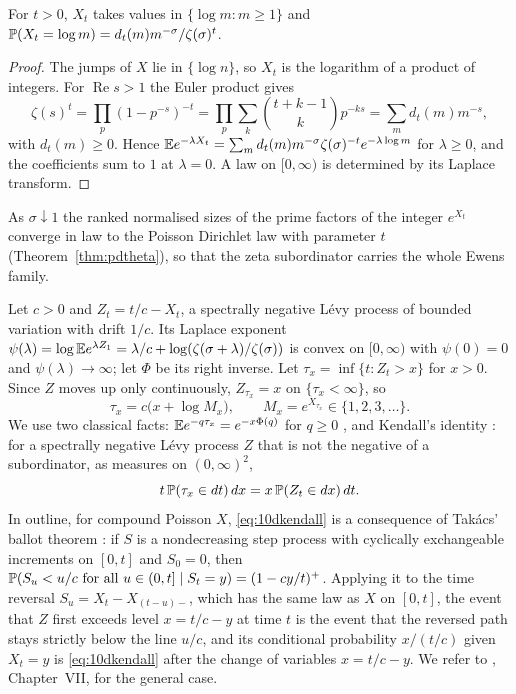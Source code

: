 \begin{proposition}\label{prop:10dsublaw}
For $t>0$, $X_t$ takes values in $\{\log m:m\ge1\}$ and $\mathbb{P}(X_t = \log m) = d_t(m)m^{-\sigma}/\zeta(\sigma)^t$.
\end{proposition}

\begin{proof}
The jumps of $X$ lie in $\{\log n\}$, so $X_t$ is the logarithm of a product of integers. For $\operatorname{Re}s>1$ the Euler product gives
\[
\zeta(s)^t = \prod_p(1-p^{-s})^{-t} = \prod_p\sum_k\binom{t+k-1}kp^{-ks} = \sum_md_t(m)m^{-s},
\]
with $d_t(m)\ge0$. Hence $\mathbb{E} e^{-\lambda X_t} = \sum_m d_t(m)m^{-\sigma}\zeta(\sigma)^{-t}e^{-\lambda\log m}$ for $\lambda\ge0$, and the coefficients sum to $1$ at $\lambda = 0$. A law on $[0,\infty)$ is determined by its Laplace transform.
\end{proof}

As $\sigma\downarrow1$ the ranked normalised sizes of the prime factors of the integer $e^{X_t}$ converge in law to the Poisson Dirichlet law with parameter $t$ (Theorem~\ref{thm:pdtheta}), so that the zeta subordinator carries the whole Ewens family.

Let $c>0$ and $Z_t = t/c-X_t$, a spectrally negative L\'evy process of bounded variation with drift $1/c$. Its Laplace exponent $\psi(\lambda) = \log\mathbb{E} e^{\lambda Z_1} = \lambda/c+\log(\zeta(\sigma+\lambda)/\zeta(\sigma))$ is convex on $[0,\infty)$ with $\psi(0)=0$ and $\psi(\lambda)\to\infty$; let $\Phi$ be its right inverse. Let $\tau_x = \inf\{t:Z_t>x\}$ for $x>0$. Since $Z$ moves up only continuously, $Z_{\tau_x} = x$ on $\{\tau_x<\infty\}$, so
\[
\tau_x = c\bigl(x+\log M_x\bigr),\qquad M_x = e^{X_{\tau_x}}\in\{1,2,3,\dots\}.
\]
We use two classical facts: $\mathbb{E} e^{-q\tau_x} = e^{-x\Phi(q)}$ for $q\ge0$ \cite{bertoin1996,kyprianou2014}, and Kendall's identity \cite{kendall1957,bertoin1996,kyprianou2014}: for a spectrally negative L\'evy process $Z$ that is not the negative of a subordinator, as measures on $(0,\infty)^2$,
\begin{equation}\label{eq:10dkendall}
t\,\mathbb{P}(\tau_x\in dt)\,dx = x\,\mathbb{P}(Z_t\in dx)\,dt .
\end{equation}
In outline, for compound Poisson $X$, \eqref{eq:10dkendall} is a consequence of Tak\'acs' ballot theorem \cite{takacs1967}: if $S$ is a nondecreasing step process with cyclically exchangeable increments on $[0,t]$ and $S_0 = 0$, then $\mathbb{P}(S_u<u/c\text{ for all }u\in(0,t]\mid S_t = y) = (1-cy/t)^+$. Applying it to the time reversal $S_u = X_t-X_{(t-u)-}$, which has the same law as $X$ on $[0,t]$, the event that $Z$ first exceeds level $x = t/c-y$ at time $t$ is the event that the reversed path stays strictly below the line $u/c$, and its conditional probability $x/(t/c)$ given $X_t = y$ is \eqref{eq:10dkendall} after the change of variables $x = t/c-y$. We refer to \cite{bertoin1996}, Chapter~VII, for the general case.

